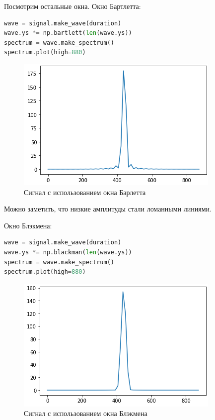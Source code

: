 Посмотрим остальные окна. Окно Бартлетта:
\begin{lstlisting}[language=Python]
wave = signal.make_wave(duration)
wave.ys *= np.bartlett(len(wave.ys))
spectrum = wave.make_spectrum()
spectrum.plot(high=880)
\end{lstlisting}
\begin{figure}[H]
	\begin{center}
		\includegraphics[scale=1]{fig/lab03/lab3_3.png}
		\caption{Сигнал с использованием окна Барлетта}
	\end{center}
\end{figure}
Можно заметить, что низкие амплитуды стали ломанными линиями.


Окно Блэкмена:
\begin{lstlisting}[language=Python]
wave = signal.make_wave(duration)
wave.ys *= np.blackman(len(wave.ys))
spectrum = wave.make_spectrum()
spectrum.plot(high=880)
\end{lstlisting}
\begin{figure}[H]
	\begin{center}
		\includegraphics[scale=1]{fig/lab03/lab3_4.png}
		\caption{Сигнал с использованием окна Блэкмена}
	\end{center}
\end{figure}

